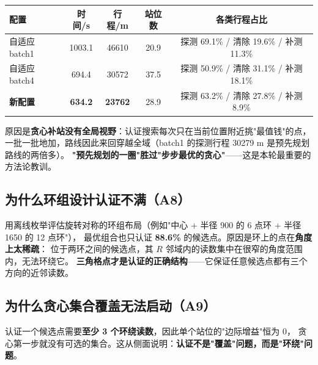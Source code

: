 \begin{center}
\begin{tabular}{lcccc}
\toprule
配置 & 时间/s & 行程/m & 站位数 & 各类行程占比 \\ \midrule
自适应 batch1 & 1003.1 & 46610 & 20.9 & 探测 69.1\% / 清除 19.6\% / 补测 11.3\% \\
自适应 batch4 & 694.4 & 30572 & 37.5 & 探测 50.9\% / 清除 31.1\% / 补测 18.1\% \\
\textbf{新配置} & \textbf{634.2} & \textbf{23762} & 28.9 & 探测 63.2\% / 清除 27.8\% / 补测 8.9\% \\
\bottomrule
\end{tabular}
\end{center}

原因是\textbf{贪心补站没有全局视野}：认证搜索每次只在当前位置附近挑"最值钱"的点，
一批一批地加，路线因此来回穿越全域（batch1 的探测行程 30279 m 是预先规划路线的两倍多）。
\textbf{"预先规划的一圈"胜过"步步最优的贪心"}——这是本轮最重要的方法论教训。

\subsection{为什么环组设计认证不满（A8）}

用离线枚举评估旋转对称的环组布局（例如"中心 $+$ 半径 900 的 6 点环 $+$ 半径 1650 的 12 点环"），
最优组合也只认证 \textbf{88.6\%} 的候选点。原因是环上的点在\textbf{角度上太稀疏}：
位于两环之间的候选点，其 $R$ 邻域内的读数集中在很窄的角度范围内，无法环绕它。
\textbf{三角格点才是认证的正确结构}——它保证任意候选点都有三个方向的近邻读数。

\subsection{为什么贪心集合覆盖无法启动（A9）}

认证一个候选点需要\textbf{至少 3 个环绕读数}，因此单个站位的"边际增益"恒为 0，
贪心第一步就没有可选的集合。这从侧面说明：\textbf{认证不是"覆盖"问题，而是"环绕"问题}。

